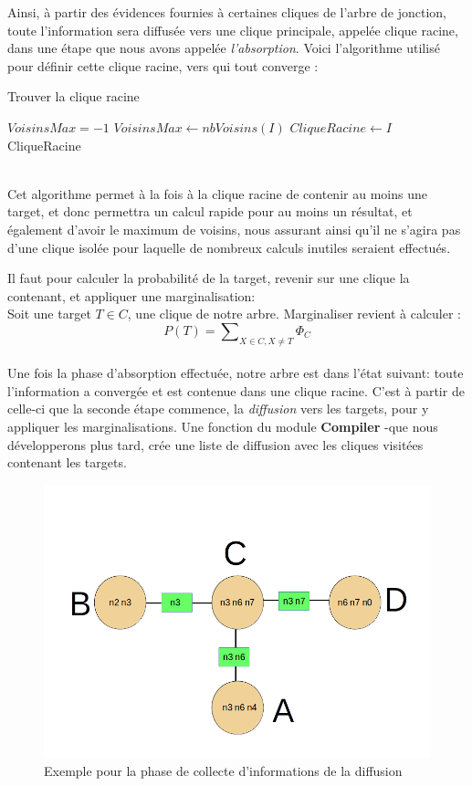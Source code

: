 \documentclass[a4paper]{article}
\begin{document}
Ainsi, à partir des évidences fournies à certaines cliques de l'arbre de jonction, toute l'information sera diffusée vers une clique principale, appelée clique racine, dans une étape que nous avons appelée 
\textit{l'absorption}. Voici l'algorithme utilisé pour définir cette clique racine, vers qui tout converge :
\begin{algorithm}
 \caption{Trouver la clique racine}
 \begin{algorithmic}
  \STATE $VoisinsMax = -1$
	  \STATE $VoisinsMax \leftarrow nbVoisins(I)$
	  \STATE $CliqueRacine \leftarrow I$
	\ENDIF
      \ENDIF
    \ENDFOR
  \ENDFOR
  \RETURN CliqueRacine
 \end{algorithmic}
\end{algorithm}
\\
Cet algorithme permet à la fois à la clique racine de contenir au moins une target, et donc permettra un calcul rapide pour au moins un résultat, et également d'avoir le maximum de voisins, nous assurant 
ainsi qu'il ne s'agira pas d'une clique isolée pour laquelle de nombreux calculs inutiles seraient effectués. 
\par \medbreak
Il faut pour calculer la probabilité de la target, revenir sur une clique la contenant, et appliquer une marginalisation:\\
Soit une target $T \in C$, une clique de notre arbre. Marginaliser revient à calculer :
$$P(T) = \sum\nolimits_{X \in C, X\neq T} \Phi_{C}$$ \\
Une fois la phase d'absorption effectuée, notre arbre est dans l'état suivant: toute l'information a convergée et est contenue dans une clique racine. C'est à partir de celle-ci que la seconde étape commence,
la \textit{diffusion} vers les targets, pour y appliquer les marginalisations. Une fonction du module \textbf{Compiler} -que nous développerons plus tard, crée une liste de diffusion avec les cliques
visitées contenant les targets. 

\begin{figure}[h!]
 \includegraphics[width=\linewidth]{Images/Diff_Jt2.png}
 \caption{Exemple pour la phase de collecte d'informations de la diffusion}
 \label{fig:Diff_Jt2}
\end{figure}
\end{document}
